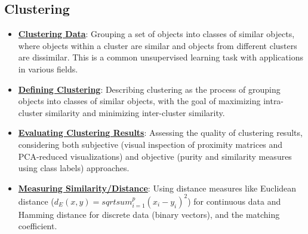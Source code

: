 \documentclass{article}%
\begin{document}
\subsection{Clustering}%
\label{subsec:Clustering}%
\begin{itemize}[leftmargin=*]%
\item \href{https://purdue.brightspace.com/d2l/common/assets/pdfjs-d2l-dist/1.0.14-legacy/web/viewer.html?file=\%2Fcontent\%2Fenforced\%2F1095467-wl.202510.CS.24300.001\%2F12L2-distance-clusters.pdf\%3Fou\%3D1095467\&lang=en-us\&container=d2l-fileviewer-rendered-pdf\&fullscreen=d2l-fileviewer-rendered-pdf-dialog\&height=667#page=4}{\textbf{Clustering Data}}: Grouping a set of objects into classes of similar objects, where objects within a cluster are similar and objects from different clusters are dissimilar. This is a common unsupervised learning task with applications in various fields.%
\item \href{https://purdue.brightspace.com/d2l/common/assets/pdfjs-d2l-dist/1.0.14-legacy/web/viewer.html?file=\%2Fcontent\%2Fenforced\%2F1095467-wl.202510.CS.24300.001\%2F12L2-distance-clusters.pdf\%3Fou\%3D1095467\&lang=en-us\&container=d2l-fileviewer-rendered-pdf\&fullscreen=d2l-fileviewer-rendered-pdf-dialog\&height=667#page=4}{\textbf{Defining Clustering}}: Describing clustering as the process of grouping objects into classes of similar objects, with the goal of maximizing intra-cluster similarity and minimizing inter-cluster similarity.%
\item \href{https://purdue.brightspace.com/d2l/common/assets/pdfjs-d2l-dist/1.0.14-legacy/web/viewer.html?file=\%2Fcontent\%2Fenforced\%2F1095467-wl.202510.CS.24300.001\%2F12L2-distance-clusters.pdf\%3Fou\%3D1095467\&lang=en-us\&container=d2l-fileviewer-rendered-pdf\&fullscreen=d2l-fileviewer-rendered-pdf-dialog\&height=667#page=32}{\textbf{Evaluating Clustering Results}}: Assessing the quality of clustering results, considering both subjective (visual inspection of proximity matrices and PCA-reduced visualizations) and objective (purity and similarity measures using class labels) approaches.%
\item \href{https://purdue.brightspace.com/d2l/common/assets/pdfjs-d2l-dist/1.0.14-legacy/web/viewer.html?file=\%2Fcontent\%2Fenforced\%2F1095467-wl.202510.CS.24300.001\%2F12L2-distance-clusters.pdf\%3Fou\%3D1095467\&lang=en-us\&container=d2l-fileviewer-rendered-pdf\&fullscreen=d2l-fileviewer-rendered-pdf-dialog\&height=667#page=17}{\textbf{Measuring Similarity/Distance}}: Using distance measures like Euclidean distance ($d_E(x, y) = sqrt{sum_{i=1}^p (x_i - y_i)^2}$) for continuous data and Hamming distance for discrete data (binary vectors), and the matching coefficient.%

\end{itemize}
\end{document}
